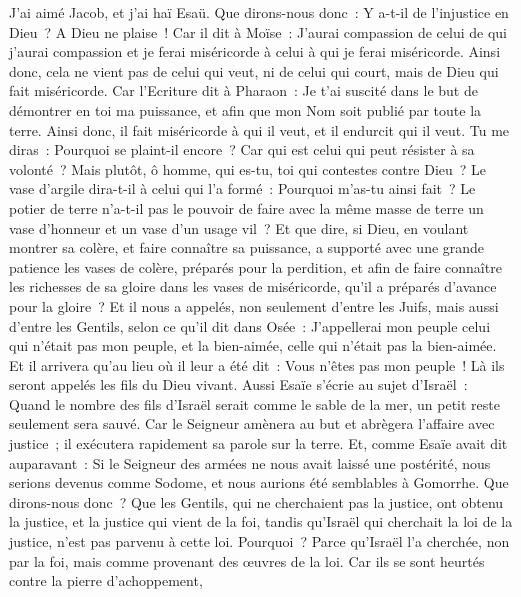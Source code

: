 \begin{multicols}{2}
J'ai aimé Jacob, et j'ai haï Esaü.
Que dirons-nous donc~: Y a-t-il de l'injustice en Dieu~? A Dieu ne plaise~!
Car il dit à Moïse~: J'aurai compassion de celui de qui j'aurai compassion et je ferai miséricorde à celui à qui je ferai miséricorde.
Ainsi donc, cela ne vient pas de celui qui veut, ni de celui qui court, mais de Dieu qui fait miséricorde.
Car l'Ecriture dit à Pharaon~: Je t'ai suscité dans le but de démontrer en toi ma puissance, et afin que mon Nom soit publié par toute la terre.
Ainsi donc, il fait miséricorde à qui il veut, et il endurcit qui il veut.
Tu me diras~: Pourquoi se plaint-il encore~? Car qui est celui qui peut résister à sa volonté~?
Mais plutôt, ô homme, qui es-tu, toi qui contestes contre Dieu~? Le vase d'argile dira-t-il à celui qui l'a formé~: Pourquoi m'as-tu ainsi fait~?
Le potier de terre n'a-t-il pas le pouvoir de faire avec la même masse de terre un vase d'honneur et un vase d'un usage vil~?
Et que dire, si Dieu, en voulant montrer sa colère, et faire connaître sa puissance, a supporté avec une grande patience les vases de colère, préparés pour la perdition,
et afin de faire connaître les richesses de sa gloire dans les vases de miséricorde, qu'il a préparés d'avance pour la gloire~?
Et il nous a appelés, non seulement d'entre les Juifs, mais aussi d'entre les Gentils,
selon ce qu'il dit dans Osée~: J'appellerai mon peuple celui qui n'était pas mon peuple, et la bien-aimée, celle qui n'était pas la bien-aimée.
Et il arrivera qu'au lieu où il leur a été dit~: Vous n'êtes pas mon peuple~! Là ils seront appelés les fils du Dieu vivant.
Aussi Esaïe s'écrie au sujet d'Israël~: Quand le nombre des fils d'Israël serait comme le sable de la mer, un petit reste seulement sera sauvé.
Car le Seigneur amènera au but et abrègera l'affaire avec justice~; il exécutera rapidement sa parole sur la terre.
Et, comme Esaïe avait dit auparavant~: Si le Seigneur des armées ne nous avait laissé une postérité, nous serions devenus comme Sodome, et nous aurions été semblables à Gomorrhe.
Que dirons-nous donc~? Que les Gentils, qui ne cherchaient pas la justice, ont obtenu la justice, et la justice qui vient de la foi,
tandis qu'Israël qui cherchait la loi de la justice, n'est pas parvenu à cette loi.
Pourquoi~? Parce qu'Israël l'a cherchée, non par la foi, mais comme provenant des œuvres de la loi. Car ils se sont heurtés contre la pierre d'achoppement,

\end{multicols}
